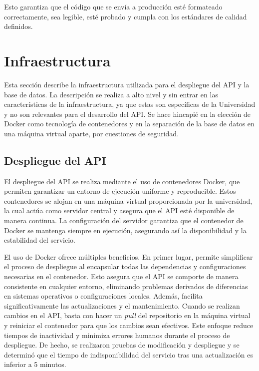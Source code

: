 Esto garantiza que el código que se envía a producción esté formateado correctamente, sea legible, esté probado y cumpla con los estándares de calidad definidos.

\section{Infraestructura}

Esta sección describe la infraestructura utilizada para el despliegue del \gls{API} y la base de datos. La descripción se realiza a alto nivel y sin entrar en las características de la infraestructura, ya que estas son específicas de la Universidad y no son relevantes para el desarrollo del \gls{API}. Se hace hincapié en la elección de \gls{Docker} como tecnología de contenedores y en la separación de la base de datos en una máquina virtual aparte, por cuestiones de seguridad.

\subsection{Despliegue del API}
\label{sec:despliegue_api}

El despliegue del \gls{API} se realiza mediante el uso de contenedores \gls{Docker}, que permiten garantizar un entorno de ejecución uniforme y reproducible. Estos contenedores se alojan en una máquina virtual proporcionada por la universidad, la cual actúa como servidor central y asegura que el \gls{API} esté disponible de manera continua. La configuración del servidor garantiza que el contenedor de \gls{Docker} se mantenga siempre en ejecución, asegurando así la disponibilidad y la estabilidad del servicio.

El uso de \gls{Docker} ofrece múltiples beneficios. En primer lugar, permite simplificar el proceso de despliegue al encapsular todas las dependencias y configuraciones necesarias en el contenedor. Esto asegura que el \gls{API} se comporte de manera consistente en cualquier entorno, eliminando problemas derivados de diferencias en sistemas operativos o configuraciones locales. Además, facilita significativamente las actualizaciones y el mantenimiento. Cuando se realizan cambios en el \gls{API}, basta con hacer un \textit{pull} del repositorio en la máquina virtual y reiniciar el contenedor para que los cambios sean efectivos. Este enfoque reduce tiempos de inactividad y minimiza errores humanos durante el proceso de despliegue. De hecho, se realizaron pruebas de modificación y despliegue y se determinó que el tiempo de indisponibilidad del servicio tras una actualización es inferior a 5 minutos.

